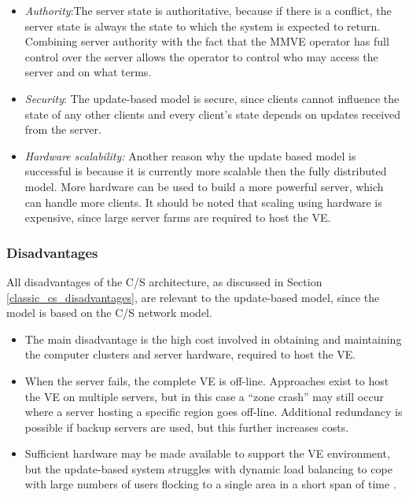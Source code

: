 \begin{itemize}
\item \emph{Authority}:The server state is authoritative, because if there is a conflict, the server state is always the state to which the system is expected to return. Combining server authority with the fact that the MMVE operator has full control over the server allows the operator to control who may access the server and on what terms.

\item \emph{Security}: The update-based model is secure, since clients cannot influence the state of any other clients and every client's state depends on updates received from the server.

\item \emph{Hardware scalability:} Another reason why the update based model is successful is because it is currently more scalable then the fully distributed model. More hardware can be used to build a more powerful server, which can handle more clients. It should be noted that scaling using hardware is expensive, since large server farms are required to host the VE.
\end{itemize}

\subsubsection{Disadvantages}


All disadvantages of the C/S architecture, as discussed in Section \ref{classic_cs_disadvantages}, are relevant to the update-based model, since the model is based on the C/S network model.
%
\begin{itemize}
\item The main disadvantage is the high cost involved in obtaining and maintaining the computer clusters and server hardware, required to host the VE.

\item When the server fails, the complete VE is off-line. Approaches exist to host the VE on multiple servers, but in this case a ``zone crash'' may still occur where a server hosting a specific region goes off-line. Additional redundancy is possible if backup servers are used, but this further increases costs.

\item Sufficient hardware may be made available to support the VE environment, but the update-based system struggles with dynamic load balancing to cope with large numbers of users flocking to a single area in a short span of time \cite{flocking}.
\end{itemize}

